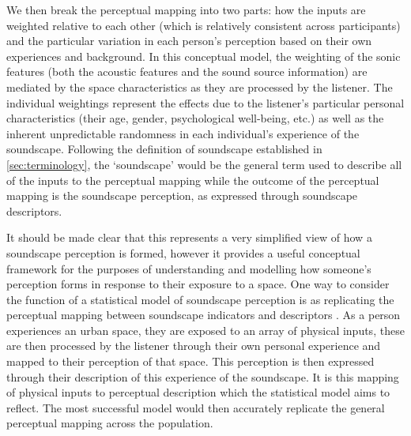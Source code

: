 We then break the perceptual mapping into two parts: how the inputs are weighted relative to each other (which is relatively consistent across participants) and the particular variation in each person's perception based on their own experiences and background. In this conceptual model, the weighting of the sonic features (both the acoustic features and the sound source information) are mediated by the space characteristics as they are processed by the listener. The individual weightings represent the effects due to the listener's particular personal characteristics (their age, gender, psychological well-being, etc.) as well as the inherent unpredictable randomness in each individual's experience of the soundscape.  Following the definition of soundscape established in \cref{sec:terminology}, the `soundscape' would be the general term used to describe all of the inputs to the perceptual mapping while the outcome of the perceptual mapping is the soundscape perception, as expressed through soundscape descriptors.

It should be made clear that this represents a very simplified view of how a soundscape perception is formed, however it provides a useful conceptual framework for the purposes of understanding and modelling how someone's perception forms in response to their exposure to a space. One way to consider the function of a statistical model of soundscape perception is as replicating the perceptual mapping between soundscape indicators and descriptors \citep{Lionello2021Thesis}. As a person experiences an urban space, they are exposed to an array of physical inputs, these are then processed by the listener through their own personal experience and mapped to their perception of that space. This perception is then expressed through their description of this experience of the soundscape. It is this mapping of physical inputs to perceptual description which the statistical model aims to reflect. The most successful model would then accurately replicate the general perceptual mapping across the population.



